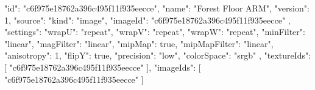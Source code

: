 {
  "id": "c6f975e18762a396c495f11f935eecce",
  "name": "Forest Floor ARM",
  "version": 1,
  "source": {
    "kind": "image",
    "imageId": "c6f975e18762a396c495f11f935eecce"
  },
  "settings": {
    "wrapU": "repeat",
    "wrapV": "repeat",
    "wrapW": "repeat",
    "minFilter": "linear",
    "magFilter": "linear",
    "mipMap": true,
    "mipMapFilter": "linear",
    "anisotropy": 1,
    "flipY": true,
    "precision": "low",
    "colorSpace": "srgb"
  },
  "textureIds": [
    "c6f975e18762a396c495f11f935eecce"
  ],
  "imageIds": [
    "c6f975e18762a396c495f11f935eecce"
  ]
}
